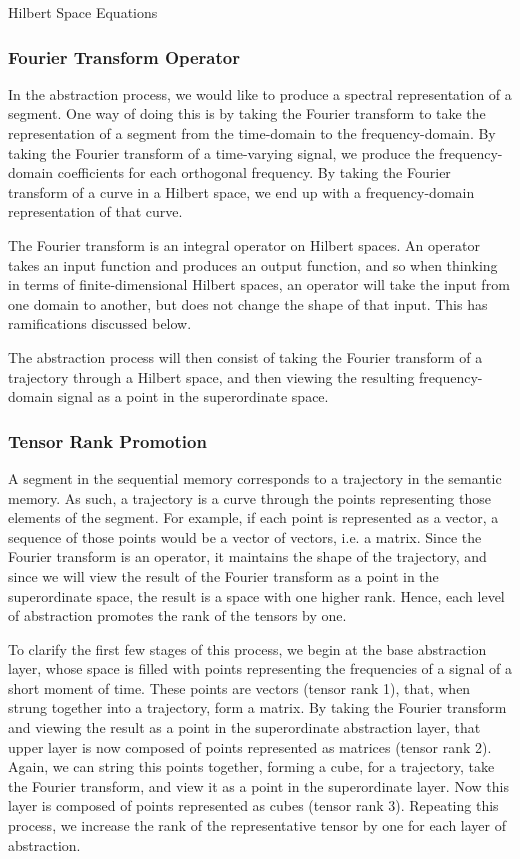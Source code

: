 \documentclass[runningheads]{llncs}
\begin{document}
Hilbert Space Equations

\subsubsection{Fourier Transform Operator}
In the abstraction process, we would like to produce a spectral representation of a segment.  One way of doing this is by taking the Fourier transform to take the representation of a segment from the time-domain to the frequency-domain.  By taking the Fourier transform of a time-varying signal, we produce the frequency-domain coefficients for each orthogonal frequency.  By taking the Fourier transform of a curve in a Hilbert space, we end up with a frequency-domain representation of that curve.

The Fourier transform is an integral operator on Hilbert spaces.  An operator takes an input function and produces an output function, and so when thinking in terms of finite-dimensional Hilbert spaces, an operator will take the input from one domain to another, but does not change the shape of that input.  This has ramifications discussed below.

The abstraction process will then consist of taking the Fourier transform of a trajectory through a Hilbert space, and then viewing the resulting frequency-domain signal as a point in the superordinate space.

\subsubsection{Tensor Rank Promotion}

A segment in the sequential memory corresponds to a trajectory in the semantic memory.  As such, a trajectory is a curve through the points representing those elements of the segment.  For example, if each point is represented as a vector, a sequence of those points would be a vector of vectors, i.e. a matrix.  Since the Fourier transform is an operator, it maintains the shape of the trajectory, and since we will view the result of the Fourier transform as a point in the superordinate space, the result is a space with one higher rank.  Hence, each level of abstraction promotes the rank of the tensors by one.  

To clarify the first few stages of this process, we begin at the base abstraction layer, whose space is filled with points representing the frequencies of a signal of a short moment of time.  These points are vectors (tensor rank 1), that, when strung together into a trajectory, form a matrix.  By taking the Fourier transform and viewing the result as a point in the superordinate abstraction layer, that upper layer is now composed of points represented as matrices (tensor rank 2).  Again, we can string this points together, forming a cube, for a trajectory, take the Fourier transform, and view it as a point in the superordinate layer.  Now this layer is composed of points represented as cubes (tensor rank 3). Repeating this process, we increase the rank of the representative tensor by one for each layer of abstraction.
\end{document}
